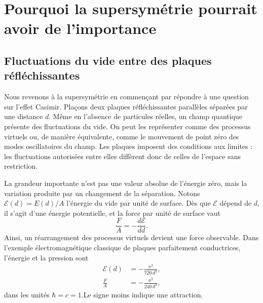 \chapter{Pourquoi la supersymétrie pourrait avoir de l’importance}


\section{Fluctuations du vide entre des plaques réfléchissantes}

Nous revenons à la supersymétrie en commençant par répondre à une question sur l’effet Casimir. Plaçons deux plaques réfléchissantes parallèles séparées par une distance \(d\). Même en l’absence de particules réelles, un champ quantique présente des fluctuations du vide. On peut les représenter comme des processus virtuels ou, de manière équivalente, comme le mouvement de point zéro des modes oscillatoires du champ. Les plaques imposent des conditions aux limites : les fluctuations autorisées entre elles diffèrent donc de celles de l’espace sans restriction.

La grandeur importante n’est pas une valeur absolue de l’énergie zéro, mais la variation produite par un changement de la séparation. Notons \(\mathcal E(d)=E(d)/A\) l’énergie du vide par unité de surface. Dès que \(\mathcal E\) dépend de \(d\), il s’agit d’une énergie potentielle, et la force par unité de surface vaut
\begin{equation}
\frac{F}{A}=-\frac{d\mathcal E}{dd}.
\end{equation}
Ainsi, un réarrangement des processus virtuels devient une force observable. Dans l’exemple électromagnétique classique de plaques parfaitement conductrices, l’énergie et la pression sont
\begin{align}
\mathcal E(d)&=-\frac{\pi^2}{720\,d^3},\\
\frac{F}{A}&=-\frac{\pi^2}{240\,d^4},
\end{align}
dans les unités \(\hbar=c=1\).Le signe moins indique une attraction.

